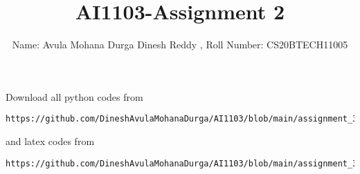 \documentclass[journal,12pt,twocolumn]{IEEEtran}
\DeclareMathOperator*{\Res}{Res}
\begin{document}
\newcommand{\BEQA}{\begin{eqnarray}}
\newcommand{\EEQA}{\end{eqnarray}}
\newcommand{\define}{\stackrel{\triangle}{=}}

\raggedbottom
\setlength{\parindent}{0pt}
\providecommand{\mbf}{\mathbf}
\providecommand{\pr}[1]{\ensuremath{\Pr\left(#1\right)}}
\providecommand{\qfunc}[1]{\ensuremath{Q\left(#1\right)}}
\providecommand{\sbrak}[1]{\ensuremath{{}\left[#1\right]}}
\providecommand{\lsbrak}[1]{\ensuremath{{}\left[#1\right.}}
\providecommand{\rsbrak}[1]{\ensuremath{{}\left.#1\right]}}
\providecommand{\brak}[1]{\ensuremath{\left(#1\right)}}
\providecommand{\lbrak}[1]{\ensuremath{\left(#1\right.}}
\providecommand{\rbrak}[1]{\ensuremath{\left.#1\right)}}
\providecommand{\cbrak}[1]{\ensuremath{\left\{#1\right\}}}
\providecommand{\lcbrak}[1]{\ensuremath{\left\{#1\right.}}
\providecommand{\rcbrak}[1]{\ensuremath{\left.#1\right\}}}
\theoremstyle{remark}
\newtheorem{rem}{Remark}
\newcommand{\sgn}{\mathop{\mathrm{sgn}}}
\providecommand{\abs}[1]{\vert#1\vert}
\providecommand{\res}[1]{\Res\displaylimits_{#1}} 
\providecommand{\norm}[1]{\lVert#1\rVert}
\providecommand{\mtx}[1]{\mathbf{#1}}
\providecommand{\mean}[1]{E[ #1 ]}
\providecommand{\fourier}{\overset{\mathcal{F}}{ \rightleftharpoons}}
\providecommand{\system}{\overset{\mathcal{H}}{ \longleftrightarrow}}
\newcommand{\solution}{\noindent \textbf{Solution: }}
\newcommand{\cosec}{\,\text{cosec}\,}
\providecommand{\dec}[2]{\ensuremath{\overset{#1}{\underset{#2}{\gtrless}}}}
\newcommand{\myvec}[1]{\ensuremath{\begin{pmatrix}#1\end{pmatrix}}}
\newcommand{\mydet}[1]{\ensuremath{\begin{vmatrix}#1\end{vmatrix}}}
\makeatletter
{}
\makeatother
\let\StandardTheFigure\thefigure
\let\vec\mathbf
\renewcommand{\thefigure}{\theproblem}
\def\putbox#1#2#3{\makebox[0in][l]{\makebox[#1][l]{}\raisebox{\baselineskip}[0in][0in]{\raisebox{#2}[0in][0in]{#3}}}}
     \def\rightbox#1{\makebox[0in][r]{#1}}
     \def\centbox#1{\makebox[0in]{#1}}
     \def\topbox#1{\raisebox{-\baselineskip}[0in][0in]{#1}}
     \def\midbox#1{\raisebox{-0.5\baselineskip}[0in][0in]{#1}}
\vspace{3cm}
\title{AI1103-Assignment 2}
\author{Name: Avula Mohana Durga Dinesh Reddy , Roll Number: CS20BTECH11005}
\maketitle
\newpage
\bigskip
\renewcommand{\thefigure}{\theenumi}
\renewcommand{\thetable}{\theenumi}
Download all python codes from 
\begin{lstlisting}
https://github.com/DineshAvulaMohanaDurga/AI1103/blob/main/assignment_3/codes/ai1103_assignment3.py
\end{lstlisting}
%
and latex codes from 
%
\begin{lstlisting}
https://github.com/DineshAvulaMohanaDurga/AI1103/blob/main/assignment_3/main.tex
\end{lstlisting}
\end{document}
